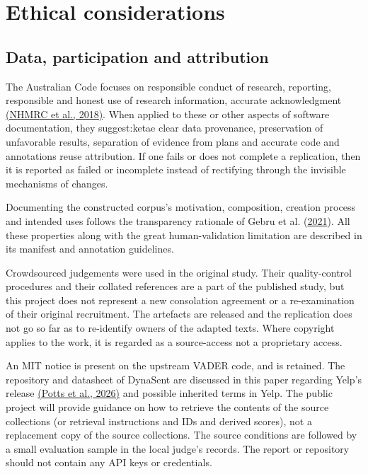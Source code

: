\documentclass[11pt]{article}
\begin{document}
\section{Ethical considerations}

\subsection{Data, participation and attribution}

The Australian Code focuses on responsible conduct of research, reporting, responsible and honest use of research information, accurate acknowledgment \hyperlink{ref_researchCode}{(NHMRC et al., 2018)}. When applied to these or other aspects of software documentation, they suggest:ketae clear data provenance, preservation of unfavorable results, separation of evidence from plans and accurate code and annotations reuse attribution. If one fails or does not complete a replication, then it is reported as failed or incomplete instead of rectifying through the invisible mechanisms of changes.


Documenting the constructed corpus's motivation, composition, creation process and intended uses follows the transparency rationale of Gebru et al. (\hyperlink{ref_gebru2021datasheets}{2021}). All these properties along with the great human-validation limitation are described in its manifest and annotation guidelines.


Crowdsourced judgements were used in the original study. Their quality-control procedures and their collated references are a part of the published study, but this project does not represent a new consolation agreement or a re-examination of their original recruitment. The artefacts are released and the replication does not go so far as to re-identify owners of the adapted texts. Where copyright applies to the work, it is regarded as a source-access not a proprietary access.


An MIT notice is present on the upstream VADER code, and is retained. The repository and datasheet of DynaSent are discussed in this paper regarding Yelp's release \hyperlink{ref_dynasentData}{(Potts et al., 2026)} and possible inherited terms in Yelp. The public project will provide guidance on how to retrieve the contents of the source collections (or retrieval instructions and IDs and derived scores), not a replacement copy of the source collections. The source conditions are followed by a small evaluation sample in the local judge's records. The report or repository should not contain any API keys or credentials.
\end{document}
